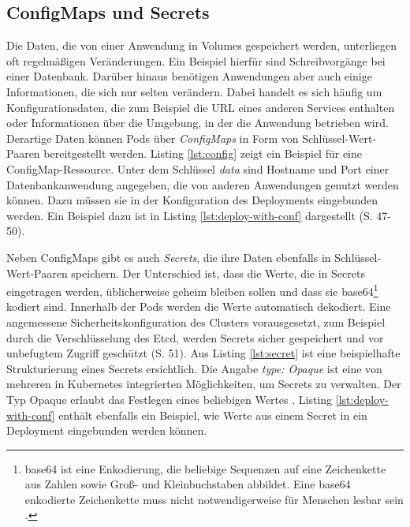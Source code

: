 \documentclass[11pt,a4paper]{article}
\begin{document}
\subsection{ConfigMaps und Secrets}
Die Daten, die von einer Anwendung in Volumes gespeichert werden, unterliegen oft regelmäßigen Veränderungen.
Ein Beispiel hierfür sind Schreibvorgänge bei einer Datenbank.
Darüber hinaus benötigen Anwendungen aber auch einige Informationen, die sich nur
selten verändern. Dabei handelt es sich häufig um Konfigurationsdaten, die zum Beispiel die URL eines anderen
Services enthalten oder Informationen über die Umgebung, in der die Anwendung betrieben wird.
Derartige Daten können Pods über \emph{ConfigMaps} in Form von Schlüssel-Wert-Paaren bereitgestellt werden.
Listing \ref{lst:config} zeigt ein Beispiel für eine ConfigMap-Ressource.
Unter dem Schlüssel \emph{data} sind Hostname und Port einer Datenbankanwendung angegeben,
die von anderen Anwendungen genutzt werden können. Dazu müssen sie in der Konfiguration des
Deployments eingebunden werden. Ein Beispiel dazu ist in Listing \ref{lst:deploy-with-conf} dargestellt \cite{Schmeling_Dargatz_2022} (S. 47-50).




Neben ConfigMaps gibt es auch \emph{Secrets}, die ihre Daten ebenfalls in Schlüssel-Wert-Paaren speichern.
Der Unterschied ist, dass die Werte, die in Secrets eingetragen werden, üblicherweise geheim bleiben sollen und
dass sie
base64\footnote{base64 ist eine Enkodierung, die beliebige Sequenzen auf eine Zeichenkette aus Zahlen sowie Groß- und Kleinbuchstaben abbildet.
  Eine base64 enkodierte Zeichenkette muss nicht notwendigerweise für Menschen lesbar sein \cite{rfc4648}.} kodiert sind.
Innerhalb der Pods werden die Werte automatisch dekodiert.
Eine angemessene Sicherheitskonfiguration des Clusters vorausgesetzt, zum Beispiel durch die Verschlüsselung des Etcd,
werden Secrets sicher gespeichert und vor unbefugtem Zugriff geschützt \cite{Schmeling_Dargatz_2022} (S. 51).
Aus Listing \ref{lst:secret} ist eine beispielhafte Strukturierung eines Secrets ersichtlich.
Die Angabe \emph{type: Opaque} ist eine von mehreren in Kubernetes integrierten Möglichkeiten,
um Secrets zu verwalten. Der Typ Opaque erlaubt das Festlegen eines beliebigen Wertes \cite{kubernetes.io_secret_types}.
Listing \ref{lst:deploy-with-conf} enthält ebenfalls ein Beispiel, wie Werte aus einem
Secret in ein Deployment eingebunden werden können.
\end{document}

